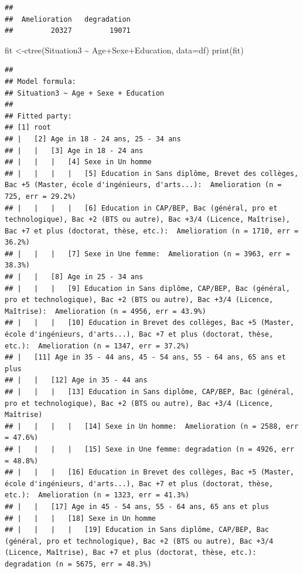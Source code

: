 \documentclass[
]{book}
\newenvironment{Shaded}{\begin{snugshade}}{\end{snugshade}}
\newcommand{\AttributeTok}[1]{\textcolor[rgb]{0.77,0.63,0.00}{#1}}
\newcommand{\FunctionTok}[1]{\textcolor[rgb]{0.00,0.00,0.00}{#1}}
\newcommand{\NormalTok}[1]{#1}
\newcommand{\OtherTok}[1]{\textcolor[rgb]{0.56,0.35,0.01}{#1}}
\newcommand{\SpecialCharTok}[1]{\textcolor[rgb]{0.00,0.00,0.00}{#1}}
\begin{document}
\begin{verbatim}
## 
##  Amelioration   degradation 
##         20327         19071
\end{verbatim}

\begin{Shaded}
\begin{Highlighting}[]
\NormalTok{fit }\OtherTok{\textless{}{-}}\FunctionTok{ctree}\NormalTok{(Situation3 }\SpecialCharTok{\textasciitilde{}}\NormalTok{ Age}\SpecialCharTok{+}\NormalTok{Sexe}\SpecialCharTok{+}\NormalTok{Education, }\AttributeTok{data=}\NormalTok{df)}
\FunctionTok{print}\NormalTok{(fit)}
\end{Highlighting}
\end{Shaded}

\begin{verbatim}
## 
## Model formula:
## Situation3 ~ Age + Sexe + Education
## 
## Fitted party:
## [1] root
## |   [2] Age in 18 - 24 ans, 25 - 34 ans
## |   |   [3] Age in 18 - 24 ans
## |   |   |   [4] Sexe in Un homme
## |   |   |   |   [5] Education in Sans diplôme, Brevet des collèges, Bac +5 (Master, école d'ingénieurs, d'arts...):  Amelioration (n = 725, err = 29.2%)
## |   |   |   |   [6] Education in CAP/BEP, Bac (général, pro et technologique), Bac +2 (BTS ou autre), Bac +3/4 (Licence, Maîtrise), Bac +7 et plus (doctorat, thèse, etc.):  Amelioration (n = 1710, err = 36.2%)
## |   |   |   [7] Sexe in Une femme:  Amelioration (n = 3963, err = 38.3%)
## |   |   [8] Age in 25 - 34 ans
## |   |   |   [9] Education in Sans diplôme, CAP/BEP, Bac (général, pro et technologique), Bac +2 (BTS ou autre), Bac +3/4 (Licence, Maîtrise):  Amelioration (n = 4956, err = 43.9%)
## |   |   |   [10] Education in Brevet des collèges, Bac +5 (Master, école d'ingénieurs, d'arts...), Bac +7 et plus (doctorat, thèse, etc.):  Amelioration (n = 1347, err = 37.2%)
## |   [11] Age in 35 - 44 ans, 45 - 54 ans, 55 - 64 ans, 65 ans et plus
## |   |   [12] Age in 35 - 44 ans
## |   |   |   [13] Education in Sans diplôme, CAP/BEP, Bac (général, pro et technologique), Bac +2 (BTS ou autre), Bac +3/4 (Licence, Maîtrise)
## |   |   |   |   [14] Sexe in Un homme:  Amelioration (n = 2588, err = 47.6%)
## |   |   |   |   [15] Sexe in Une femme: degradation (n = 4926, err = 48.8%)
## |   |   |   [16] Education in Brevet des collèges, Bac +5 (Master, école d'ingénieurs, d'arts...), Bac +7 et plus (doctorat, thèse, etc.):  Amelioration (n = 1323, err = 41.3%)
## |   |   [17] Age in 45 - 54 ans, 55 - 64 ans, 65 ans et plus
## |   |   |   [18] Sexe in Un homme
## |   |   |   |   [19] Education in Sans diplôme, CAP/BEP, Bac (général, pro et technologique), Bac +2 (BTS ou autre), Bac +3/4 (Licence, Maîtrise), Bac +7 et plus (doctorat, thèse, etc.): degradation (n = 5675, err = 48.3%)

\end{verbatim}
\end{document}
